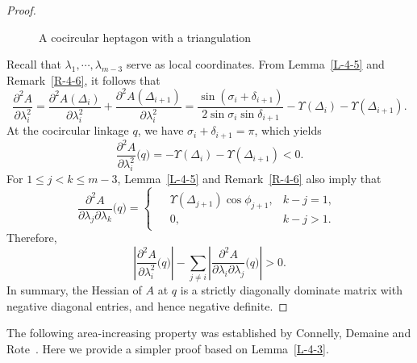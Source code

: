 \documentclass[11pt,letterpaper]{amsart}
\theoremstyle{plain}
\theoremstyle{definition}
\theoremstyle{remark}
\numberwithin{equation}{section}
\begin{document}
\begin{proof}
\begin{figure}[htbp]
\caption{A cocircular heptagon with a triangulation}
\label{F-3}
\end{figure}

Recall that $\lambda_1,\cdots,\lambda_{m-3}$ serve as local coordinates. From Lemma~\ref{L-4-5} and Remark~\ref{R-4-6}, it follows that
\[
\frac{\partial^2 A}{\partial \lambda_i^2}=\frac{\partial^2 A(\Delta_i)}{\partial \lambda_i^2}+\frac{\partial^2 A(\Delta_{i+1})}{\partial \lambda_i^2}=\frac{\sin(\sigma_i+\delta_{i+1})}{2\sin\sigma_i\sin\delta_{i+1}}-\Upsilon(\Delta_i)-\Upsilon(\Delta_{i+1}).
\]
At the cocircular linkage $q$, we have $\sigma_i+\delta_{i+1}=\pi$, which yields
\[
\frac{\partial^2 A}{\partial \lambda_i^2}\big(q\big)=-\Upsilon(\Delta_i)-\Upsilon(\Delta_{i+1})<0.
\]
For $1\leq j<k\leq m-3$, Lemma~\ref{L-4-5} and Remark~\ref{R-4-6} also imply that
\[
\frac{\partial^2 A}{\partial \lambda_j\partial \lambda_k}\big(q\big)
=\begin{cases}
\begin{aligned}
&\Upsilon(\Delta_{j+1})\cos\phi_{j+1},&k-j=1,\\
&0,  &k-j>1.
\end{aligned}
\end{cases}
\]
Therefore,
\[
\left|\frac{\partial^2 A}{\partial \lambda_i^2}\big(q\big)\right|-\sum_{j\neq i}\left|\frac{\partial^2 A}{\partial \lambda_i\partial \lambda_j}\big(q\big)\right|>0.
\]
In summary, the Hessian of $A$ at $q$ is a strictly diagonally dominate matrix with negative diagonal entries, and hence negative definite.
\end{proof}


The following area-increasing property was established by Connelly, Demaine and Rote~\cite[Theorem 7]{Connelly-2003}. Here we provide a simpler proof based on Lemma~\ref{L-4-3}.
\end{document}
